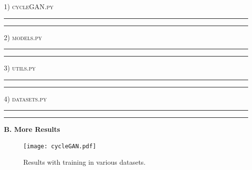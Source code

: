 \documentclass[a4paper]{article}
\newcommand{\HRule}{\rule{\linewidth}{0.5mm}}
\begin{document}
\noindent \LARGE \textsc{1) cycleGAN.py} \small

\noindent \HRule



\noindent \HRule

\vspace{1.5cm}

\noindent \LARGE \textsc{2) models.py} \small

\noindent \HRule



\noindent \HRule

\vspace{1.5cm}

\noindent \LARGE \textsc{3) utils.py} \small

\noindent \HRule



\noindent \HRule

\vspace{1.5cm}

\noindent \LARGE \textsc{4) datasets.py} \small

\noindent \HRule

 

\noindent \HRule

\vspace{2cm}

\begin{center}
\LARGE\textbf{B. More Results} \\
\end{center}

\vspace{3mm}
\begin{figure}[H]
\centering
\texttt{[image: cycleGAN.pdf]}
\caption{Results with training in various datasets.}
\end{figure}
\vspace{2mm}
\end{document}

